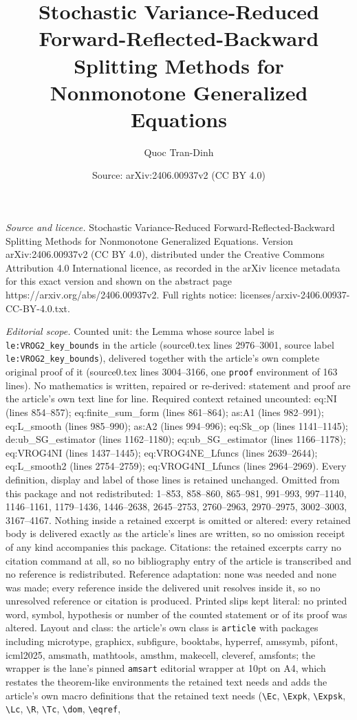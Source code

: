 \documentclass[10pt,a4paper]{amsart}
\title[Stochastic Variance-Reduced Forward-Reflected-Backward Split]{Stochastic Variance-Reduced Forward-Reflected-Backward Splitting Methods for Nonmonotone Generalized Equations}
\author{Quoc Tran-Dinh}
\date{Source: arXiv:2406.00937v2 (CC BY 4.0)}
\begin{document}
\maketitle

\noindent\emph{Source and licence.} Stochastic Variance-Reduced Forward-Reflected-Backward Splitting Methods for Nonmonotone Generalized Equations. Version arXiv:2406.00937v2 (CC BY 4.0), distributed under the Creative Commons Attribution 4.0 International licence, as recorded in the arXiv licence metadata for this exact version and shown on the abstract page https://arxiv.org/abs/2406.00937v2. Full rights notice: licenses/arxiv-2406.00937-CC-BY-4.0.txt.\par\smallskip

\noindent\textit{Editorial scope.} Counted unit: the Lemma whose source label is \texttt{le:VROG2\_key\_bounds} in the article (source0.tex lines 2976--3001, source label \texttt{le:VROG2\_key\_bounds}), delivered together with the article's own complete original proof of it (source0.tex lines 3004--3166, one \texttt{proof} environment of 163 lines). No mathematics is written, repaired or re-derived: statement and proof are the article's own text line for line. Required context retained uncounted: eq:NI (lines 854--857); eq:finite\_sum\_form (lines 861--864); as:A1 (lines 982--991); eq:L\_smooth (lines 985--990); as:A2 (lines 994--996); eq:Sk\_op (lines 1141--1145); de:ub\_SG\_estimator (lines 1162--1180); eq:ub\_SG\_estimator (lines 1166--1178); eq:VROG4NI (lines 1437--1445); eq:VROG4NE\_Lfuncs (lines 2639--2644); eq:L\_smooth2 (lines 2754--2759); eq:VROG4NI\_Lfuncs (lines 2964--2969). Every definition, display and label of those lines is retained unchanged. Omitted from this package and not redistributed: 1--853, 858--860, 865--981, 991--993, 997--1140, 1146--1161, 1179--1436, 1446--2638, 2645--2753, 2760--2963, 2970--2975, 3002--3003, 3167--4167. Nothing inside a retained excerpt is omitted or altered: every retained body is delivered exactly as the article's lines are written, so no omission receipt of any kind accompanies this package. Citations: the retained excerpts carry no citation command at all, so no bibliography entry of the article is transcribed and no reference is redistributed. Reference adaptation: none was needed and none was made; every reference inside the delivered unit resolves inside it, so no unresolved reference or citation is produced. Printed slips kept literal: no printed word, symbol, hypothesis or number of the counted statement or of its proof was altered. Layout and class: the article's own class is \texttt{article} with packages including microtype, graphicx, subfigure, booktabs, hyperref, amssymb, pifont, icml2025, amsmath, mathtools, amsthm, makecell, cleveref, amsfonts; the wrapper is the lane's pinned \texttt{amsart} editorial wrapper at 10pt on A4, which restates the theorem-like environments the retained text needs and adds the article's own macro definitions that the retained text needs (\texttt{\textbackslash Ec}, \texttt{\textbackslash Expk}, \texttt{\textbackslash Expsk}, \texttt{\textbackslash Lc}, \texttt{\textbackslash R}, \texttt{\textbackslash Tc}, \texttt{\textbackslash dom}, \texttt{\textbackslash eqref}, 
\end{document}
